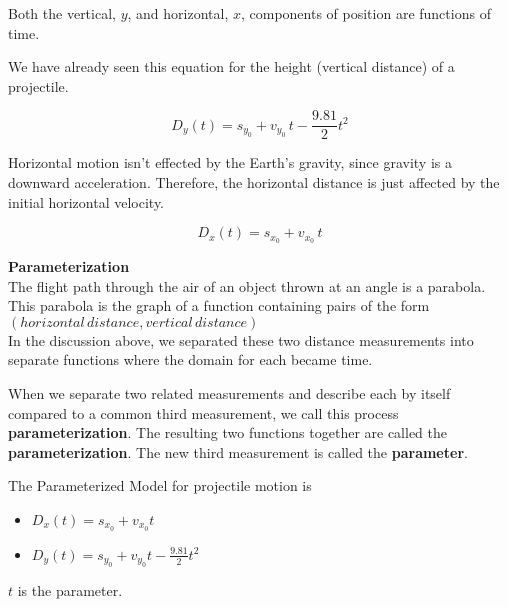 \documentclass{ximera}
\begin{document}
Both the vertical, $y$, and horizontal, $x$, components of position are functions of time.

We have already seen this equation for the height (vertical distance) of a projectile.

\[ 
D_y(t) = s_{y_0} + v_{y_0} \, t - \frac{9.81}{2} t^2  
\]

Horizontal motion isn't effected by the Earth's gravity, since gravity is a downward acceleration. Therefore, the horizontal distance is just affected by the initial horizontal velocity.


\[ 
D_x(t) = s_{x_0} + v_{x_0} \, t  
\]






\begin{definition} \textbf{\textcolor{green!50!black}{Parameterization}} \\

The flight path through the air of an object thrown at an angle is a parabola.  This parabola is the graph of a function containing pairs of the form $(horizontal \, distance, vertical \,distance)$ \\

In the discussion above, we separated these two distance measurements into separate functions where the domain for each became time.



When we separate two related measurements and describe each by itself compared to a common third measurement, we call this process \textbf{parameterization}.  The resulting two functions together are called the \textbf{parameterization}.  The new third measurement is called the \textbf{parameter}.





\begin{model} 


The Parameterized Model for projectile motion is


\begin{itemize}
\item $D_x(t) = s_{x_0} + v_{x_0} t$
\item $D_y(t) = s_{y_0} + v_{y_0} t - \frac{9.81}{2} t^2$
\end{itemize}

$t$ is the parameter.

\end{model}



\end{definition}
\end{document}
